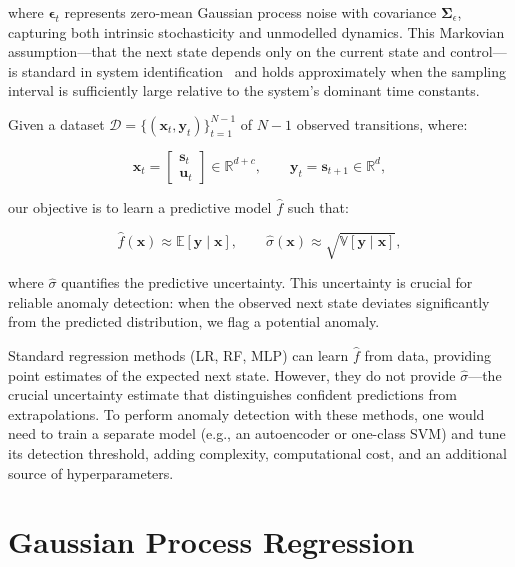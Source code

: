 \documentclass[conference]{IEEEtran}
\begin{document}
where $\boldsymbol{\epsilon}_t$ represents zero-mean Gaussian process noise with covariance $\boldsymbol{\Sigma}_\epsilon$, capturing both intrinsic stochasticity and unmodelled dynamics. This Markovian assumption---that the next state depends only on the current state and control---is standard in system identification~\cite{ljung1999} and holds approximately when the sampling interval is sufficiently large relative to the system's dominant time constants.

Given a dataset $\mathcal{D} = \{(\mathbf{x}_t, \mathbf{y}_t)\}_{t=1}^{N-1}$ of $N-1$ observed transitions, where:

\begin{equation}
\mathbf{x}_t = \begin{bmatrix} \mathbf{s}_t \\ \mathbf{u}_t \end{bmatrix} \in \mathbb{R}^{d+c}, \qquad
\mathbf{y}_t = \mathbf{s}_{t+1} \in \mathbb{R}^{d},
\label{eq:data}
\end{equation}

our objective is to learn a predictive model $\hat{f}$ such that:

\begin{equation}
\hat{f}(\mathbf{x}) \approx \mathbb{E}[\mathbf{y} \mid \mathbf{x}], \qquad
\hat{\sigma}(\mathbf{x}) \approx \sqrt{\mathbb{V}[\mathbf{y} \mid \mathbf{x}]},
\label{eq:objective}
\end{equation}

where $\hat{\sigma}$ quantifies the predictive uncertainty. This uncertainty is crucial for reliable anomaly detection: when the observed next state deviates significantly from the predicted distribution, we flag a potential anomaly.

Standard regression methods (LR, RF, MLP) can learn $\hat{f}$ from data, providing point estimates of the expected next state. However, they do not provide $\hat{\sigma}$---the crucial uncertainty estimate that distinguishes confident predictions from extrapolations. To perform anomaly detection with these methods, one would need to train a separate model (e.g., an autoencoder or one-class SVM) and tune its detection threshold, adding complexity, computational cost, and an additional source of hyperparameters.

\section{Gaussian Process Regression}
\label{sec:prelim}
\end{document}
